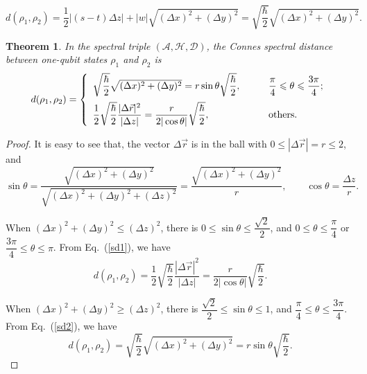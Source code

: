 \documentclass[10pt,a4paper]{amsart}
\newtheorem{theorem}{Theorem}
\begin{document}
\begin{equation}\label{sd2}
	d(\rho_1,\rho_2)
	=\frac{1}{2}|(s-t)\Delta z|
	+|w|\sqrt{(\Delta x)^2+(\Delta y)^2}
	=\sqrt{\frac{\hbar}{2}}\sqrt{(\Delta x)^2+(\Delta y)^2}.
\end{equation}

\begin{theorem}
	In the spectral triple $(\mathcal{A},\mathcal{H},\mathcal{D})$, the Connes spectral distance between one-qubit states $\rho_1$ and $\rho_2$ is
	\begin{equation}\label{drr}
		d(\rho_1, \rho_2)=
		\left\{
		\begin{array}{ll}
			\sqrt{\dfrac{\hbar}{2}}\sqrt{(\Delta x)^2+(\Delta y)^2}
			=r\sin\theta\sqrt{\dfrac{\hbar}{2}},
			& \qquad\hbox{$\dfrac{\pi}{4}\leqslant \theta \leqslant \dfrac{3\pi}{4}$;} \\[1em]
			\dfrac{1}{2}\sqrt{\dfrac{\hbar}{2}}\dfrac{|\Delta \vec{r}|^2}{|\Delta z|}
			=\dfrac{r}{2|\cos\theta|}\sqrt{\dfrac{\hbar}{2}},
			& \qquad\hbox{others.}
		\end{array}
		\right.
	\end{equation}
\end{theorem}

\begin{proof}
It is easy to see that, the vector $\Delta \vec{r}$ is in the ball with $0\leqslant |\Delta \vec{r}|= r \leqslant 2$, and
\begin{equation}
	\sin \theta=\frac{\sqrt{(\Delta x)^2+(\Delta y)^2}}{\sqrt{(\Delta x)^2+(\Delta y)^2+(\Delta z)^2}}
	=\frac{\sqrt{(\Delta x)^2+(\Delta y)^2}}{r},\qquad
	\cos \theta=\frac{\Delta z}{r}.
\end{equation}

When
$(\Delta x)^2+(\Delta y)^2\leqslant (\Delta z)^2$, there is
$0\leqslant \sin\theta \leqslant\dfrac{\sqrt{2}}{2}$,
and $0\leqslant \theta \leqslant \dfrac{\pi}{4}$ or $\dfrac{3\pi}{4}\leqslant \theta \leqslant \pi$. From Eq.~(\ref{sd1}), we have
\begin{equation}
	d(\rho_1,\rho_2)
	=\frac{1}{2}\sqrt{\frac{\hbar}{2}}\frac{|\Delta \vec{r}|^2}{|\Delta z|}
	=\dfrac{r}{2|\cos\theta|}\sqrt{\dfrac{\hbar}{2}}.
\end{equation}


When $(\Delta x)^2+(\Delta y)^2\geqslant (\Delta z)^2$,
there is
$\dfrac{\sqrt{2}}{2}\leqslant \sin\theta \leqslant 1$,
and $\dfrac{\pi}{4}\leqslant \theta \leqslant\dfrac{3\pi}{4}$. From Eq.~(\ref{sd2}), we have
\begin{equation}
	d(\rho_1,\rho_2)
	=\sqrt{\frac{\hbar}{2}}\sqrt{(\Delta x)^2+(\Delta y)^2}
	=r\sin\theta\sqrt{\dfrac{\hbar}{2}}.
\end{equation}
\end{proof}
\end{document}
